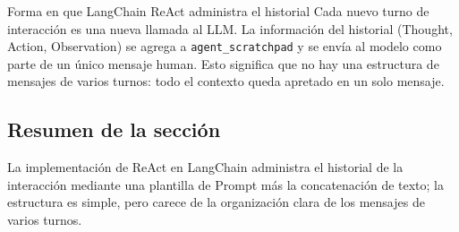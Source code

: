 \begin{warningbox}{Forma en que LangChain ReAct administra el historial}
Cada nuevo turno de interacción es una nueva llamada al LLM. La información del historial (Thought, Action, Observation) se agrega a \texttt{agent\_scratchpad} y se envía al modelo como parte de un único mensaje human. Esto significa que no hay una estructura de mensajes de varios turnos: todo el contexto queda apretado en un solo mensaje.
\end{warningbox}

\subsection{Resumen de la sección}
La implementación de ReAct en LangChain administra el historial de la interacción mediante una plantilla de Prompt más la concatenación de texto; la estructura es simple, pero carece de la organización clara de los mensajes de varios turnos.


